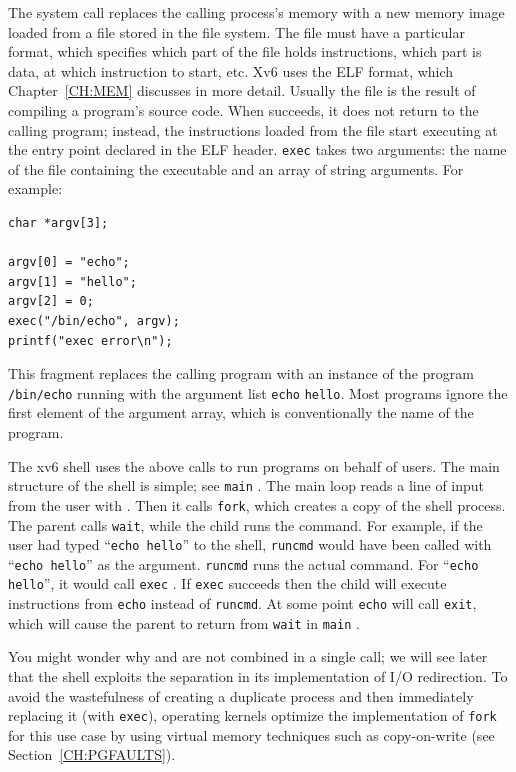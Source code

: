 The
system call
replaces the calling process's memory with a new memory
image loaded from a file stored in the file system.
The file must have a particular format, which specifies which part of
the file holds instructions, which part is data, at which instruction
to start, etc. Xv6
uses the ELF format, which Chapter~\ref{CH:MEM} discusses in
more detail.
Usually the file is the result of compiling a program's source code.
When
succeeds, it does not return to the calling program;
instead, the instructions loaded from the file start
executing at the entry point declared in the ELF header.
\lstinline{exec}
takes two arguments: the name of the file containing the
executable and an array of string arguments.
For example:
\begin{lstlisting}[]
char *argv[3];

argv[0] = "echo";
argv[1] = "hello";
argv[2] = 0;
exec("/bin/echo", argv);
printf("exec error\n");
\end{lstlisting}
This fragment replaces the calling program with an instance
of the program 
\lstinline{/bin/echo}
running with the argument list
\lstinline{echo}
\lstinline{hello}.
Most programs ignore the first element of the argument array, which is 
conventionally the name of the program.

The xv6 shell uses the above calls to run programs on behalf of
users. The main structure of the shell is simple; see
\lstinline{main} 
.
The main loop reads a line of input from the user with
.
Then it calls 
\lstinline{fork}, 
which creates a copy of the shell process. The
parent calls
\lstinline{wait},
while the child runs the command.  For example, if the user
had typed
``\lstinline{echo hello}''
to the shell,
\lstinline{runcmd}
would have been called with
``\lstinline{echo hello}''
as the argument.
\lstinline{runcmd} 
runs the actual command. For
``\lstinline{echo hello}'',
it would call
\lstinline{exec} 
.
If
\lstinline{exec}
succeeds then the child will execute instructions from
\lstinline{echo}
instead of
\lstinline{runcmd}.  
At some point
\lstinline{echo}
will call
\lstinline{exit},
which will cause the parent to return from
\lstinline{wait}
in 
\lstinline{main}
.

You might wonder why
and
are not combined in a single call; we will see later that 
the shell exploits the separation in its implementation of
I/O redirection.
To avoid the wastefulness of
creating a duplicate process and then immediately replacing it (with \lstinline{exec}),
operating kernels optimize the implementation of
\lstinline{fork}
for this use case by using virtual memory techniques such as
copy-on-write (see Section~\ref{CH:PGFAULTS}).

